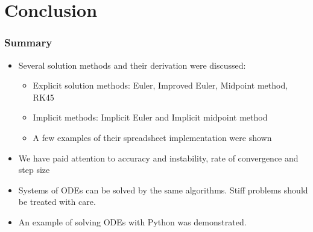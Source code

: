 \section{Conclusion}

\begin{frame}
  \frametitle{Summary}
  \begin{itemize}
    \item Several solution methods and their derivation were discussed:
    \begin{itemize}
      \item Explicit solution methods: Euler, Improved Euler, Midpoint method, RK45
      \item Implicit methods: Implicit Euler and Implicit midpoint method
      \item A few examples of their spreadsheet implementation were shown
    \end{itemize}
    \item We have paid attention to accuracy and instability, rate of convergence and step size
    \item Systems of ODEs can be solved by the same algorithms. Stiff problems should be treated with care.
    \item An example of solving ODEs with Python was demonstrated.
  \end{itemize}
\end{frame}